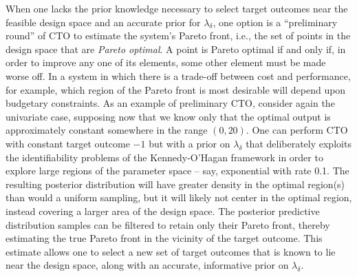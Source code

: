 \documentclass[12pt]{article}
\begin{document}
%
When one lacks the prior knowledge necessary to select target outcomes near the feasible design space and an accurate prior for $\lambda_\delta$, one option is a ``preliminary round'' of CTO to estimate the system's Pareto front, i.e., the set of points in the design space that are {\em Pareto optimal}.
%
A point is Pareto optimal if and only if, in order to improve any one of its elements, some other element must be made worse off.
%
%
In a system in which there is a trade-off between cost and performance, for example, which region of the Pareto front is most desirable will depend upon budgetary constraints.
%
As an example of preliminary CTO, consider again the univariate case, supposing now that we know only that the optimal output is approximately constant somewhere in the range $(0,20)$.
%
%
%
%
One can perform CTO with constant target outcome $-1$ but with a prior on $\lambda_\delta$ that deliberately exploits the identifiability problems of the Kennedy-O'Hagan framework in order to explore large regions of the parameter space -- say, exponential with rate 0.1.
%
The resulting posterior distribution will have greater density in the optimal region(s) than would a uniform sampling, but it will likely not center in the optimal region, instead covering a larger area of the design space.
The posterior predictive distribution samples can be filtered to retain only their Pareto front, thereby estimating the true Pareto front in the vicinity of the target outcome.
%
%
This estimate allows one to select a new set of target outcomes that is known to lie near the design space, along with an accurate, informative prior on $\lambda_\delta$.
\end{document}
